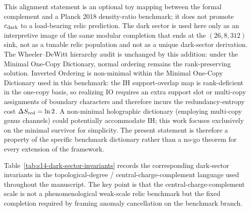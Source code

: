 \documentclass[11pt]{article}
\begin{document}
This alignment statement is an optional toy mapping between the formal complement and a Planck 2018 density-ratio benchmark; it does not promote $c_{\rm dark}$ to a load-bearing relic prediction. The dark sector is used here only as an interpretive image of the same modular completion that ends at the $(26,8,312)$ sink, not as a tunable relic population and not as a unique dark-sector derivation. The Wheeler--DeWitt hierarchy audit is unchanged by this addition:
under the Minimal One-Copy Dictionary, normal ordering remains the rank-preserving solution. Inverted Ordering is non-minimal within the Minimal One-Copy Dictionary used in this benchmark: the IH support-overlap map is rank-deficient in the one-copy basis, so realizing IO requires an extra support slot or multi-copy assignments of boundary characters and therefore incurs the redundancy-entropy
cost $\Delta S_{\rm red}=\ln 2$. A non-minimal holographic dictionary (employing multi-copy genus channels) could potentially accommodate IH; this work focuses exclusively on the minimal survivor for simplicity. The present statement is therefore a property of the specific benchmark dictionary rather than a no-go theorem for every extension of the framework.

Table~\ref{tab:s14-dark-sector-invariants} records the corresponding dark-sector
invariants in the topological-degree / central-charge-complement language used throughout the
manuscript. The key point is that the central-charge-complement scale is not a phenomenological
weak-scale relic benchmark but the fixed completion required by framing anomaly cancellation on the
benchmark branch.
\end{document}
